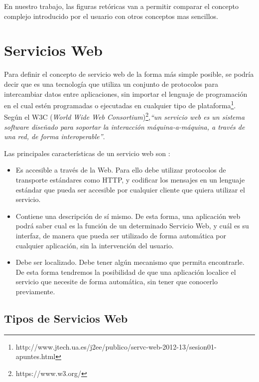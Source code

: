 En nuestro trabajo, las figuras retóricas van a permitir comparar el concepto complejo introducido por el usuario con otros conceptos mas sencillos.

\section{Servicios Web}
\label{cap:sec:serviciosweb}

Para definir el concepto de servicio web de la forma más simple posible, se podría decir que es una tecnología que utiliza un conjunto de protocolos para intercambiar datos entre aplicaciones, sin importar el lenguaje de programación en el cual estén programadas o ejecutadas en cualquier tipo de plataforma\footnote{http://www.jtech.ua.es/j2ee/publico/servc-web-2012-13/sesion01-apuntes.html}. Según el W3C (\textit{World Wide Web Consortium})\footnote{https://www.w3.org/},\textit{``un servicio web es un sistema software diseñado para soportar la interacción máquina-a-máquina, a través de una red, de forma interoperable''}.

Las principales características de un servicio web son \citep{TorresJoaquin2017SC}:

\begin{itemize}
	\item Es accesible a través de la Web. Para ello debe utilizar protocolos de transporte estándares como HTTP, y codificar los mensajes en un lenguaje estándar que pueda ser accesible por cualquier cliente que quiera utilizar el servicio. 
	
	\item Contiene una descripción de sí mismo. De esta forma, una aplicación web podrá saber cual es la función de un determinado Servicio Web, y cuál es su interfaz, de manera que pueda ser utilizado de forma automática por cualquier aplicación, sin la intervención del usuario.
	
	\item Debe ser localizado. Debe tener algún mecanismo que permita encontrarle. De esta forma tendremos la posibilidad de que una aplicación localice el servicio que necesite de forma automática, sin tener que conocerlo previamente.
\end{itemize}

\subsection{Tipos de Servicios Web}
\label{cap:subsec:tiposserviciosweb}

